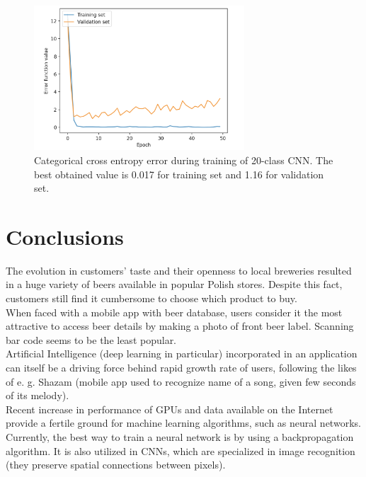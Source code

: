 \documentclass[11pt]{article}
\begin{document}
\begin{figure}[h]
\includegraphics[width=0.7\textwidth]{20_class_err}
\centering
\caption{Categorical cross entropy error during training of 20-class CNN. The best obtained value is 0.017 for training set and 1.16 for validation set.}
\label{fig:20_class_err}
\end{figure}
\clearpage

\section{Conclusions} \label{conclusions}
The evolution in customers' taste and their openness to local breweries resulted in a huge variety of beers available in popular Polish stores. Despite this fact, customers still find it cumbersome to choose which product to buy.\\

When faced with a mobile app with beer database, users consider it the most attractive to access beer details by making a photo of front beer label. Scanning bar code seems to be the least popular.\\

Artificial Intelligence (deep learning in particular) incorporated in an application can itself be a driving force behind rapid growth rate of users, following the likes of e. g. Shazam (mobile app used to recognize name of a song, given few seconds of its melody).\\

Recent increase in performance of GPUs and data available on the Internet provide a fertile ground for machine learning algorithms, such as neural networks.\\

Currently, the best way to train a neural network is by using a backpropagation algorithm. It is also utilized in CNNs, which are specialized in image recognition (they preserve spatial connections between pixels).\\
\end{document}
